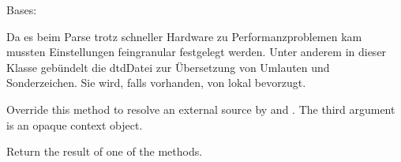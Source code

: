 \documentclass[a4paper,10pt,ngerman]{sphinxmanual}
\begin{document}
\begin{fulllineitems}
\label{\detokenize{api:src.dblp_parser.LocalDTDResolver}}
\pysigstartsignatures
\pysiglinewithargsret
{}
{}
{}
\pysigstopsignatures
\sphinxAtStartPar
Bases: 

\sphinxAtStartPar
Da es beim Parse trotz schneller Hardware zu Performanzproblemen kam mussten Einstellungen feingranular festgelegt werden. Unter anderem in dieser Klasse gebündelt die dtd\sphinxhyphen{}Datei zur Übersetzung von Umlauten und Sonderzeichen. Sie wird, falls vorhanden, von lokal bevorzugt.

\begin{fulllineitems}
\label{\detokenize{api:src.dblp_parser.LocalDTDResolver.resolve}}
\pysigstartsignatures
\pysiglinewithargsret
{}
{\sphinxparamcomma {}\sphinxparamcomma {}\sphinxparamcomma {}}
{}
\pysigstopsignatures
\sphinxAtStartPar
Override this method to resolve an external source by
 and .  The third argument is an
opaque context object.

\sphinxAtStartPar
Return the result of one of the  methods.

\end{fulllineitems}


\end{fulllineitems}

\end{document}
